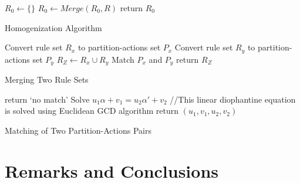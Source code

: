 \documentclass[]{elsarticle}
\theoremstyle{definition}
\theoremstyle{definition}
\begin{document}
\begin{algorithm}[H]
\SetAlgoLined
{}
$R_0 \leftarrow \{\}$\;
{
   $R_0 \leftarrow Merge(R_0,R)$\;
}
return $R_0$\;
\caption{Homogenization Algorithm}
\end{algorithm}

\begin{algorithm}[H]
\SetAlgoLined
{}
Convert rule set $R_x$ to partition-actions set $P_x$\;
Convert rule set $R_y$ to partition-actions set $P_y$\;
{
   $R_Z \leftarrow R_x \cup R_y$\;
}
{
   Match $P_x$ and $P_y$\; 
   {
   }
}
return $R_Z$\;
\caption{Merging Two Rule Sets}
\end{algorithm}


\begin{algorithm}[H]
\SetAlgoLined
{}

{
   return `no match'\;
}
{
   Solve $u_1\alpha+v_1=u_2\alpha'+v_2$\;
   //This linear diophantine equation is solved using Euclidean GCD algorithm\;
}
return $(u_1,v_1,u_2,v_2)$\;
\caption{Matching of Two Partition-Actions Pairs}
\end{algorithm}

\section{Remarks and Conclusions}\label{sec-rem-con}







 
\end{document}
